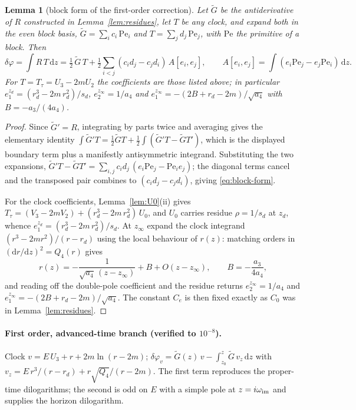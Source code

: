 \documentclass[12pt]{iopart}
\newcommand{\dd}{\mathrm{d}}
\theoremstyle{plain}
\theoremstyle{definition}
\theoremstyle{plain}
\newtheorem{auxlemma}{Lemma}
\theoremstyle{remark}
\begin{document}
\begin{auxlemma}[block form of the first-order correction]\label{lem:blocks}
Let $\tilde G$ be the antiderivative of $R$ constructed in
Lemma~\ref{lem:residues}, let $T$ be any clock, and expand both in the even block
basis, $\tilde G=\sum_ic_i\,\mathrm{Pe}_i$ and $T=\sum_jd_j\,\mathrm{Pe}_j$, with
$\mathrm{Pe}$ the primitive of a block. Then
\begin{equation}
   \delta\varphi=\int R\,T\,\dd z
   =\tfrac12\,\tilde G\,T+\tfrac12\sum_{i<j}(c_id_j-c_jd_i)\,A[e_i,e_j],
   \qquad A[e_i,e_j]=\int(e_i\mathrm{Pe}_j-e_j\mathrm{Pe}_i)\,\dd z .
   \label{eq:block-form}
\end{equation}
For $T=T_\tau=U_3-2mU_2$ the coefficients are those listed above; in particular
$e_1^{z_d}=(r_d^3-2m\,r_d^2)/s_d$, $e_2^{z_\infty}=1/a_4$ and
$e_1^{z_\infty}=-(2B+r_d-2m)/\sqrt{a_4}$ with $B=-a_3/(4a_4)$.
\end{auxlemma}

\begin{proof}
Since $\tilde G'=R$, integrating by parts twice and averaging gives the elementary
identity $\int\tilde G'T=\tfrac12\tilde GT+\tfrac12\int(\tilde G'T-\tilde GT')$, which is
the displayed boundary term plus a manifestly antisymmetric integrand. Substituting the
two expansions,
$\tilde G'T-\tilde GT'=\sum_{i,j}c_id_j\,(e_i\mathrm{Pe}_j-\mathrm{Pe}_ie_j)$; the
diagonal terms cancel and the transposed pair combines to $(c_id_j-c_jd_i)$, giving
\eqref{eq:block-form}.

For the clock coefficients, Lemma~\ref{lem:U0}(ii) gives
$T_\tau=(V_3-2mV_2)+(r_d^3-2m\,r_d^2)\,U_0$, and $U_0$ carries residue $\rho=1/s_d$ at
$z_d$, whence $e_1^{z_d}=(r_d^3-2m\,r_d^2)/s_d$. At $z_\infty$ expand the clock integrand
$(r^3-2mr^2)/(r-r_d)$ using the local behaviour of $r(z)$: matching orders in
$(\dd r/\dd z)^2=Q_4(r)$ gives
\[
   r(z)=-\frac{1}{\sqrt{a_4}\,(z-z_\infty)}+B+O(z-z_\infty),
   \qquad B=-\frac{a_3}{4a_4},
\]
and reading off the double-pole coefficient and the residue returns $e_2^{z_\infty}=1/a_4$
and $e_1^{z_\infty}=-(2B+r_d-2m)/\sqrt{a_4}$. The constant $C_e$ is then fixed exactly as
$C_0$ was in Lemma~\ref{lem:residues}.
\end{proof}

\paragraph{First order, advanced-time branch (verified to $10^{-8}$).}
Clock $v=E\,U_3+r+2m\ln(r-2m)$;
$\delta\varphi_v=\tilde G(z)\,v-\int_{z_0}^z\tilde G\,v_z\,\dd z$ with
$v_z=E\,r^3/(r-r_d)+r\sqrt{Q_4}/(r-2m)$. The first term reproduces the proper-time
dilogarithms; the second is odd on $E$ with a simple pole at $z=i\omega_{\rm im}$ and
supplies the horizon dilogarithm.
\end{document}
